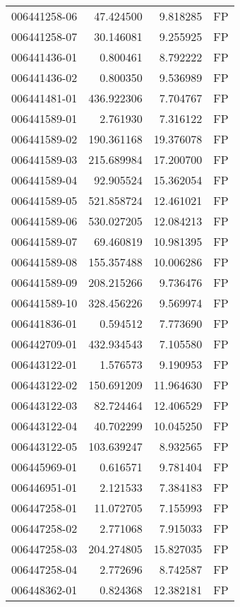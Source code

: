 \begin{tabular}{lrrl}
006441258-06 &   47.424500 &     9.818285 &   FP \\
006441258-07 &   30.146081 &     9.255925 &   FP \\
006441436-01 &    0.800461 &     8.792222 &   FP \\
006441436-02 &    0.800350 &     9.536989 &   FP \\
006441481-01 &  436.922306 &     7.704767 &   FP \\
006441589-01 &    2.761930 &     7.316122 &   FP \\
006441589-02 &  190.361168 &    19.376078 &   FP \\
006441589-03 &  215.689984 &    17.200700 &   FP \\
006441589-04 &   92.905524 &    15.362054 &   FP \\
006441589-05 &  521.858724 &    12.461021 &   FP \\
006441589-06 &  530.027205 &    12.084213 &   FP \\
006441589-07 &   69.460819 &    10.981395 &   FP \\
006441589-08 &  155.357488 &    10.006286 &   FP \\
006441589-09 &  208.215266 &     9.736476 &   FP \\
006441589-10 &  328.456226 &     9.569974 &   FP \\
006441836-01 &    0.594512 &     7.773690 &   FP \\
006442709-01 &  432.934543 &     7.105580 &   FP \\
006443122-01 &    1.576573 &     9.190953 &   FP \\
006443122-02 &  150.691209 &    11.964630 &   FP \\
006443122-03 &   82.724464 &    12.406529 &   FP \\
006443122-04 &   40.702299 &    10.045250 &   FP \\
006443122-05 &  103.639247 &     8.932565 &   FP \\
006445969-01 &    0.616571 &     9.781404 &   FP \\
006446951-01 &    2.121533 &     7.384183 &   FP \\
006447258-01 &   11.072705 &     7.155993 &   FP \\
006447258-02 &    2.771068 &     7.915033 &   FP \\
006447258-03 &  204.274805 &    15.827035 &   FP \\
006447258-04 &    2.772696 &     8.742587 &   FP \\
006448362-01 &    0.824368 &    12.382181 &   FP \\

\end{tabular}
